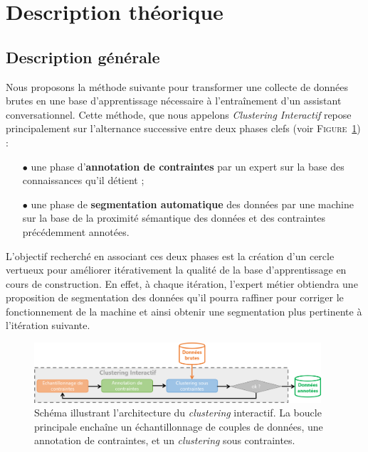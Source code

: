 	\section{Description théorique}
	\label{section:3.2-DESCRIPTION-THEORIQUE}
		
		
		\subsection{Description générale}
		\label{section:3.2.1-DESCRIPTION-THEORIQUE-GENERALE}
		
		Nous proposons la méthode suivante pour transformer une collecte de données brutes en une base d'apprentissage nécessaire à l’entraînement d'un assistant conversationnel.
		Cette méthode, que nous appelons \textit{Clustering Interactif} repose principalement sur l'alternance successive entre deux phases clefs (voir \textsc{Figure~\ref{figure:3.2-CLUSTERING-INTERACTIF}}) :
		\begin{itemize}
			\item[\(\bullet\)] une phase d'\textbf{annotation de contraintes}
			par un expert sur la base des connaissances qu'il détient ;
			\item[\(\bullet\)] une phase de \textbf{segmentation automatique} des données
			par une machine sur la base de la proximité sémantique des données et des contraintes précédemment annotées.
		\end{itemize}
		
		L'objectif recherché en associant ces deux phases est la création d'un cercle vertueux pour améliorer itérativement la qualité de la base d'apprentissage en cours de construction.
		En effet, à chaque itération, l'expert métier obtiendra une proposition de segmentation des données qu'il pourra raffiner pour corriger le fonctionnement de la machine et ainsi obtenir une segmentation plus pertinente à l'itération suivante.
		
		\begin{figure}[!htb]
			\centering
			\includegraphics[width=0.95\textwidth]{figures/interactive-clustering-architecture-sequentielle}
			\caption{
				Schéma illustrant l'architecture du \textit{clustering} interactif. La boucle principale enchaîne un échantillonnage de couples de données, une annotation de contraintes, et un \textit{clustering} sous contraintes.
			}
			\label{figure:3.2-CLUSTERING-INTERACTIF}
		\end{figure}
		
